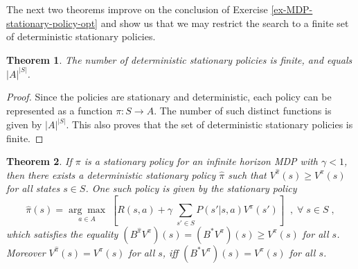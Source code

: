\documentclass{article}
\newtheorem{theorem}{Theorem}[section]
\theoremstyle{definition}
\theoremstyle{remark}
\begin{document}
The next two theorems improve on the conclusion of Exercise \ref{ex-MDP-stationary-policy-opt} and show us that we may restrict the search to a finite set of deterministic stationary policies.

\begin{theorem}
The number of deterministic stationary policies is finite, and equals $|A|^{|S|}$.
\label{th-finite-policies-deterministic}
\end{theorem}

\begin{proof}
Since the policies are stationary and deterministic, each policy can be represented as a function $\pi : S \rightarrow A$. The number of such distinct functions is given by $|A|^{|S|}$. This also proves that the set of deterministic stationary policies is finite.
\end{proof}

\begin{theorem}
If $\pi$ is a stationary policy for an infinite horizon MDP with $\gamma < 1$, then there exists a deterministic stationary policy $\hat{\pi}$ such that $V^{\hat{\pi}}(s) \geq V^{\pi}(s)$ for all states $s \in S$. One such policy is given by the stationary policy
\begin{equation}
\hat{\pi}(s) = \underset{a \in A}{\arg\max} \; \left[ R(s,a) + \gamma \; \sum_{s' \in S} P(s'|s,a) V^{\pi}(s') \right] \;\;,\; \forall \; s \in S \;,
\label{eq:deterministic-policy-better-theorem-eq1}
\end{equation}
which satisfies the equality $(B^{\hat{\pi}}V^{\pi})(s) = (B^{\ast}V^{\pi})(s) \geq V^{\pi}(s)$ for all $s$. Moreover $V^{\hat{\pi}}(s) = V^{\pi}(s)$ for all $s$, iff $(B^{\ast}V^{\pi})(s) = V^{\pi}(s)$ for all $s$.
\label{th-deterministic-policy-better}
\end{theorem}
\end{document}
